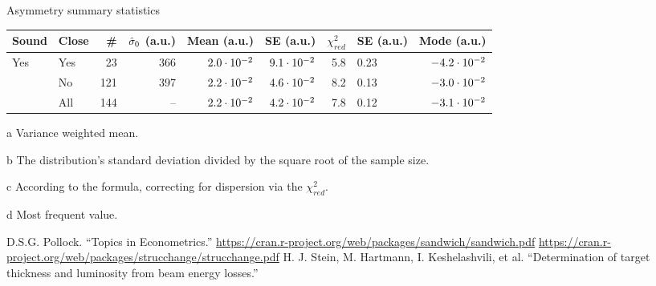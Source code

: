 \documentclass{article}
\begin{document}
\begin{threeparttable}[H]
	\centering
	\caption{Asymmetry summary statistics\label{tbl:AyySumStat}}
	\begin{tabular}{llrrrrrlr}
		\hline\hline
		Sound                & Close &  \# & $\CS*[0]$ (a.u.) & Mean\tnote{a} (a.u.) & SE\tnote{b} (a.u.) & $\chi^2_{red}$ & SE\tnote{c} (a.u.) & Mode\tnote{d} (a.u.) \\ \hline
		\multirow{3}{*}{Yes} & Yes   &  23 &              366 &       $2.0\cdot10^{-2}$ &     $9.1\cdot10^{-2}$ &            5.8 & 0.23               &      $-4.2\cdot10^{-2}$ \\
		                     & No    & 121 &              397 &       $2.2\cdot10^{-2}$ &     $4.6\cdot10^{-2}$ &            8.2 & 0.13               &      $-3.0\cdot10^{-2}$ \\
		                     & All   & 144 &               -- &       $2.2\cdot10^{-2}$ &     $4.2\cdot10^{-2}$ &            7.8 & 0.12               &      $-3.1\cdot10^{-2}$ \\ \hline
	\end{tabular}
	\begin{tablenotes}
		\item[a]{Variance weighted mean.}
		\item[b]{The distribution's standard deviation divided by the square root of the sample size.}
		\item[c]{According to the formula, correcting for dispersion via the $\chi^2_{red}$.}
		\item[d]{Most frequent value.}
	\end{tablenotes}
\end{threeparttable}

\begin{thebibliography}{9}
	D.S.G. Pollock. ``Topics in Econometrics.''
	\url{https://cran.r-project.org/web/packages/sandwich/sandwich.pdf}
	\url{https://cran.r-project.org/web/packages/strucchange/strucchange.pdf}
	H. J. Stein, M. Hartmann, I. Keshelashvili, et al. ``Determination of target thickness and luminosity from beam energy losses.''
\end{thebibliography}
\end{document}
